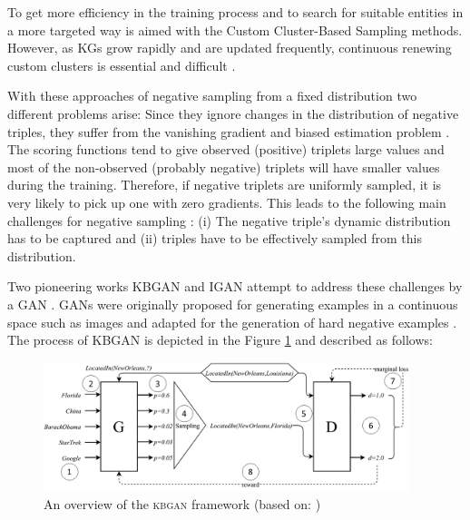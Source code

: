 To get more efficiency in the training process and to search for suitable entities in a more targeted way is aimed with the Custom Cluster-Based Sampling methods.
However, as \acp{KG} grow rapidly and are updated frequently, continuous renewing custom clusters is essential and difficult \cite{qianunderstanding}.

With these approaches of negative sampling from a fixed distribution two different problems arise:
Since they ignore changes in the distribution of negative triples, they suffer from the vanishing gradient and biased estimation problem \cite{zhang2021efficient}.
The scoring functions tend to give observed (positive) triplets large values and most of the non-observed (probably negative) triplets will have smaller values during the training.
Therefore, if negative triplets are uniformly sampled, it is very likely to pick up one with zero gradients.
This leads to the following main challenges for negative sampling \cite{zhang2021efficient}: 
(i) The negative triple's dynamic distribution has to be captured and 
(ii) triples have to be effectively sampled from this distribution.

Two pioneering works \ac{KBGAN} \cite{cai2017kbgan} and \ac{IGAN} \cite{IGAN} attempt to address these challenges by a \ac{GAN} \cite{zhang2021efficient}.
\acp{GAN} were originally proposed for generating examples in a continuous space such as images and adapted for the generation of hard negative examples \cite{zhang2021efficient}.
The process of \ac{KBGAN} is depicted in the Figure \ref{fig:overview} and described as follows:
\begin{figure}[t]
  \centering
    \includegraphics[width=0.95\textwidth]{figures/kbgan_original.png}
  \caption{An overview of the \textsc{kbgan} framework (based on: \cite{cai2017kbgan})}
  \label{fig:overview}
\end{figure}

